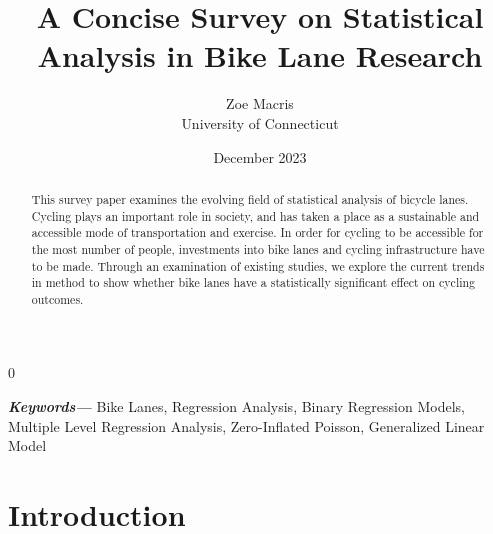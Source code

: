 \documentclass[12pt, letterpaper]{article}
\newcommand{\blind}{0}
\providecommand{\keywords}[1]
{
  \small	
  \textbf{\textit{Keywords---}} #1
}
\begin{document}

\blind
{
  \title{\bf A Concise Survey on Statistical Analysis in Bike Lane Research}
  \author{Zoe Macris\\
  University of Connecticut}
\date{December 2023}
  \maketitle} 


\begin{abstract}
This survey paper examines the evolving field of statistical analysis of bicycle lanes. Cycling plays an important role in society, and has taken a place as a sustainable and accessible mode of transportation and exercise. In order for cycling to be accessible for the most number of people, investments into bike lanes and cycling infrastructure have to be made. Through an examination of existing studies, we explore the current trends in method to show whether bike lanes have a statistically significant effect on cycling outcomes. 
\end{abstract}
\label{sec:abstract}

\keywords{Bike Lanes, Regression Analysis, Binary Regression Models, Multiple Level Regression Analysis, Zero-Inflated Poisson, Generalized Linear Model}


\section{Introduction}
\label{sec:intro}
\end{document}
